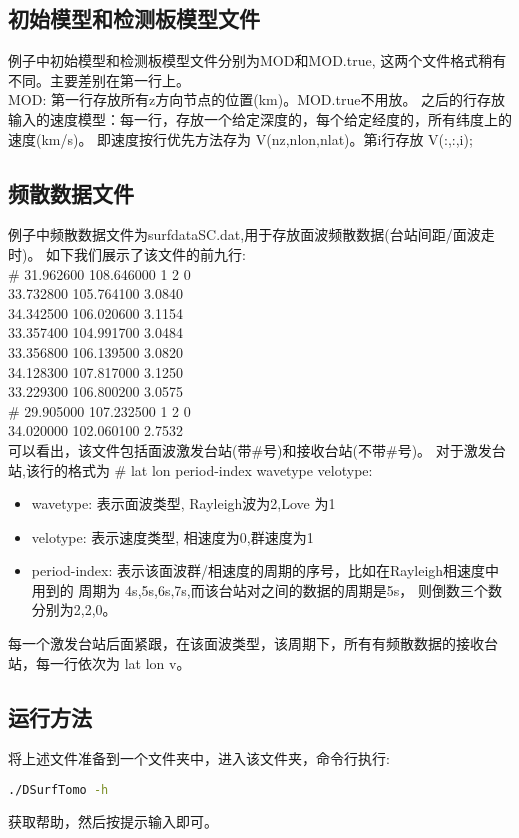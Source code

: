 \documentclass[10p,UTF8]{ctexart}
\begin{document}
   \subsection{初始模型和检测板模型文件}
   例子中初始模型和检测板模型文件分别为MOD和MOD.true, 这两个文件格式稍有不同。主要差别在第一行上。\\
   MOD: 第一行存放所有z方向节点的位置(km)。MOD.true不用放。
   之后的行存放输入的速度模型：每一行，存放一个给定深度的，每个给定经度的，所有纬度上的速度(km/s)。
   即速度按行优先方法存为 V(nz,nlon,nlat)。第i行存放 V(:,:,i);

   \subsection{频散数据文件}
   例子中频散数据文件为surfdataSC.dat,用于存放面波频散数据(台站间距/面波走时)。 
   如下我们展示了该文件的前九行:\\
    \#  31.962600 108.646000 1 2 0\\
    33.732800 105.764100 3.0840\\
    34.342500 106.020600 3.1154\\
    33.357400 104.991700 3.0484\\
    33.356800 106.139500 3.0820\\
    34.128300 107.817000 3.1250\\
    33.229300 106.800200 3.0575\\
    \#  29.905000 107.232500 1 2 0\\
    34.020000 102.060100 2.7532\\

   可以看出，该文件包括面波激发台站(带\#号)和接收台站(不带\#号)。
   对于激发台站,该行的格式为 \# lat lon period-index wavetype velotype:
   \begin{itemize}
       \item wavetype: 表示面波类型, Rayleigh波为2,Love 为1
       \item velotype: 表示速度类型, 相速度为0,群速度为1
       \item period-index: 表示该面波群/相速度的周期的序号，比如在Rayleigh相速度中用到的
                            周期为 4s,5s,6s,7s,而该台站对之间的数据的周期是5s，
                            则倒数三个数分别为2,2,0。
   \end{itemize}
   每一个激发台站后面紧跟，在该面波类型，该周期下，所有有频散数据的接收台站，每一行依次为 lat lon v。

   \subsection{运行方法}
   将上述文件准备到一个文件夹中，进入该文件夹，命令行执行:
   \begin{lstlisting}[language=bash]
    ./DSurfTomo -h
   \end{lstlisting}
   获取帮助，然后按提示输入即可。
\end{document}
